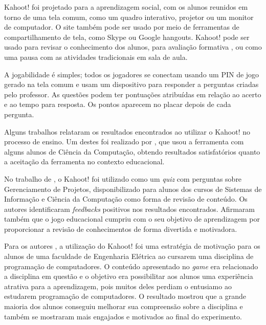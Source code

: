 Kahoot! foi projetado para a aprendizagem social, com os alunos reunidos em torno de uma tela comum, como um quadro interativo, projetor ou um monitor de computador. O site também pode ser usado por meio de ferramentas de compartilhamento de tela, como Skype ou Google hangouts. Kahoot! pode ser usado para revisar o conhecimento dos alunos, para avaliação formativa \cite{kahootFormative}, ou como uma pausa com as atividades tradicionais em sala de aula. 

A jogabilidade é simples; todos os jogadores se conectam usando um PIN de jogo gerado na tela comum e usam um dispositivo para responder a perguntas criadas pelo professor. As questões podem ter pontuações atribuídas em relação ao acerto e ao tempo para resposta. Os pontos aparecem no placar depois de cada pergunta.

Alguns trabalhos relataram os resultados encontrados ao utilizar o Kahoot! no processo de ensino. Um destes foi realizado por , que usou a ferramenta com alguns alunos de Ciência da Computação, obtendo resultados satisfatórios quanto a aceitação da ferramenta no contexto educacional.

 
 No trabalho de , o Kahoot! foi utilizado como um \textit{quiz} com perguntas sobre Gerenciamento de Projetos, disponibilizado para alunos dos cursos de Sistemas de
Informação e Ciência da Computação como forma de revisão de conteúdo. Os autores identificaram \textit{feedbacks} positivos nos resultados encontrados. Afirmaram também que o jogo educacional cumpriu com o seu objetivo de aprendizagem por proporcionar a revisão de conhecimentos de forma divertida e motivadora.

Para os autores , a utilização do Kahoot! foi uma estratégia de motivação para os alunos de uma faculdade de Engenharia Elétrica ao cursarem uma disciplina de programação de computadores. O conteúdo apresentado no \textit{game} era relacionado a disciplina em questão e o objetivo era possibilitar aos alunos uma experiência atrativa para a aprendizagem, pois muitos deles perdiam o entusiamo ao estudarem programação de computadores. O resultado mostrou que a grande maioria dos alunos conseguiu melhorar sua  compreensão sobre a disciplina e também se mostraram mais engajados e motivados ao final do experimento.

